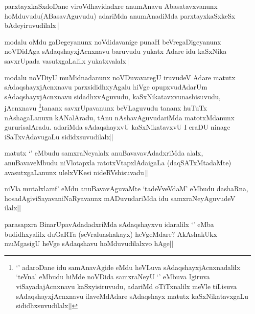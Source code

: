 
\begin{artha}
parxtayxkaSxdoDane viroVdhavidadxre anumAnavu Abasatavxvanunx hoMduvudu(ABasavAguvudu) adariMda anumAnadiMda parxtayxkaSxkeSx bAdeyiruvudilalx||
\end{artha}


\begin{artha}
modalu oMdu gaDegeyanunx noVdidavanige punaH beVregaDigeyanunx noVDidAga sAdaqshayxjAcnxnavu baruvudu yukatx Adare idu kaSxNika savxrUpada vasutxgaLalilx yukatxvalalx||
\end{artha}

\begin{artha}
modalu noVDiyU muMidnadanunx noVDuvavaregU iruvudeV Adare matutx sAdaqshayxjAcnxnavu parxsididhxyAgalu hiVge opupxvudAdarUm sAdaqshayxjAcnxnavu sidadhxvAguvudu, kaSxNikatavxvunashisuvudu, jAcnxnavu \footnote{`\stext' adaroDane idu samAnavAgide eMdu heVLuva sAdaqshayxjAcnxnadalilx  `teVna' eMbudu hiMde noVDida samxraNeyU `\stext' eMbuva Igiruva viSayadajAcnxnavu kaSxyisiruvudu, adariMd oTiTxnalilx meVle tiLisuva sAdaqshayxjAcnxnavu ilaveMdAdare sAdaqshayx matutx kaSxNikatavxgaLu sididhxsuvudilalx||}tananx savxrUpavanunx beVLaguvudu tananx huTuTx nAshagaLanuxn kANalAradu, tAnu nAshavAguvudariMda matotxMdanunx gururisalAradu. adariMda sAdaqshayxvU kaSxNikatavxvU I eraDU ninage iSaTxvAdavugaLu sididxsuvudilalx||
\end{artha}

\begin{artha}
matutx `\stext' eMbudu samxraNeyalalx anuBavavavAdadxriMda alalx, anuBavaveMbudu niVlotapxla ratotxVtapxlAdaigaLa (daqSATxMtadaMte) avasutxgaLanunx ulelxVKesi nideRVshisuvadu||
\end{artha}

\begin{artha}
niVla mutalxlamf' eMdu anuBavavAguvaMte `tadeVveVdaM' eMbudu dashaRna, hosadAgiviSayavaniNaRyavaunx mADuvudariMda idu samxraNeyAguvudeV ilalx||
\end{artha}

\begin{artha}
parasapxra BinarUpavAdadadxriMda sAdaqshayxvu idaralilx `\stext' eMba budidhxyalilx duGaRTa (seVraluashakayx) heVgeMdare? AkAshakUkx muMgasigU heVge sAdaqshavu hoMduvudilalxvo hAge||
\end{artha}

